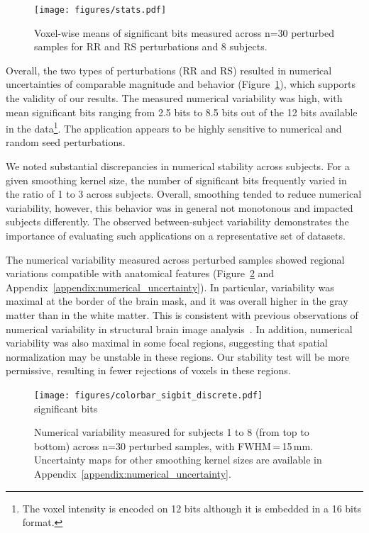 \documentclass[lettersize,journal]{IEEEtran}
\begin{document}
{\begin{figure}
  \centering
  \texttt{[image: figures/stats.pdf]}
  \caption{Voxel-wise means of significant bits
    measured across n=30 perturbed samples for RR and RS perturbations and 8
    subjects.}
  \label{fig:significant-digits}
\end{figure}
Overall, the two types of perturbations (RR and RS) resulted in numerical uncertainties of comparable magnitude and behavior (Figure~\ref{fig:significant-digits}), which supports the validity of our results. The measured numerical variability was high, with mean significant bits ranging from 2.5 bits to 8.5 bits out of the 12 bits available in the data\footnote{The voxel intensity is encoded on 12 bits although it is embedded in a 16 bits format.}. The application appears to be highly sensitive to numerical and random seed perturbations.

We noted substantial discrepancies in numerical stability across subjects. For a given smoothing kernel size, the number of significant bits frequently varied in the ratio of 1 to 3 across subjects. Overall, smoothing tended to reduce numerical variability, however, this behavior was in general not monotonous and impacted subjects differently. The observed between-subject variability
demonstrates the importance of evaluating such applications on a representative set of datasets.

The numerical variability measured across perturbed samples showed regional variations compatible with anatomical features (Figure~\ref{fig:uncertainty-maps} and Appendix~\ref{appendix:numerical_uncertainty}). In particular, variability was maximal at the border of the brain mask, and it was overall higher in the gray matter than in the white matter.
This is consistent with previous observations of numerical variability in structural brain image analysis~\cite{salari2021accurate}.
In addition, numerical variability was also maximal in some focal regions, suggesting that spatial normalization may be unstable in these regions.
Our stability test will be more permissive, resulting in fewer rejections of voxels in these regions.

\begin{figure}
  \vspace*{-20pt}\hspace{15pt}
  \texttt{[image: figures/colorbar\_sigbit\_discrete.pdf]} \\
  \vspace*{-5pt}
  significant bits
  \caption{Numerical variability measured for subjects 1 to 8 (from top to bottom) across n=30 perturbed samples, with FWHM\,=\,15\,mm. Uncertainty maps for other smoothing kernel sizes are available in Appendix~\ref{appendix:numerical_uncertainty}.}
  \label{fig:uncertainty-maps}
\end{figure}

}
\end{document}
